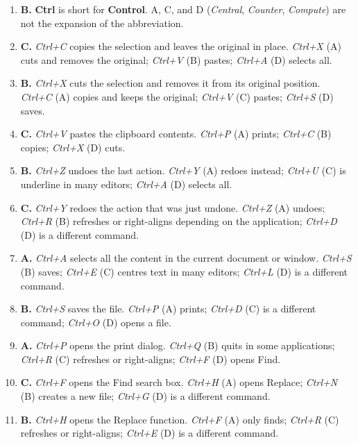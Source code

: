 \begin{enumerate}[label=\textbf{Q\arabic*.}, leftmargin=*]
\item \textbf{B.} \textbf{Ctrl} is short for \textbf{Control}. A, C, and D
  (\textit{Central}, \textit{Counter}, \textit{Compute}) are not the expansion
  of the abbreviation.
\item \textbf{C.} \textit{Ctrl+C} copies the selection and leaves the original
  in place. \textit{Ctrl+X} (A) cuts and removes the original; \textit{Ctrl+V}
  (B) pastes; \textit{Ctrl+A} (D) selects all.
\item \textbf{B.} \textit{Ctrl+X} cuts the selection and removes it from its
  original position. \textit{Ctrl+C} (A) copies and keeps the original;
  \textit{Ctrl+V} (C) pastes; \textit{Ctrl+S} (D) saves.
\item \textbf{C.} \textit{Ctrl+V} pastes the clipboard contents. \textit{Ctrl+P}
  (A) prints; \textit{Ctrl+C} (B) copies; \textit{Ctrl+X} (D) cuts.
\item \textbf{B.} \textit{Ctrl+Z} undoes the last action. \textit{Ctrl+Y} (A)
  redoes instead; \textit{Ctrl+U} (C) is underline in many editors; \textit{Ctrl+A}
  (D) selects all.
\item \textbf{C.} \textit{Ctrl+Y} redoes the action that was just undone.
  \textit{Ctrl+Z} (A) undoes; \textit{Ctrl+R} (B) refreshes or right-aligns
  depending on the application; \textit{Ctrl+D} (D) is a different command.
\item \textbf{A.} \textit{Ctrl+A} selects all the content in the current
  document or window. \textit{Ctrl+S} (B) saves; \textit{Ctrl+E} (C) centres
  text in many editors; \textit{Ctrl+L} (D) is a different command.
\item \textbf{B.} \textit{Ctrl+S} saves the file. \textit{Ctrl+P} (A) prints;
  \textit{Ctrl+D} (C) is a different command; \textit{Ctrl+O} (D) opens a file.
\item \textbf{A.} \textit{Ctrl+P} opens the print dialog. \textit{Ctrl+Q} (B)
  quits in some applications; \textit{Ctrl+R} (C) refreshes or right-aligns;
  \textit{Ctrl+F} (D) opens Find.
\item \textbf{C.} \textit{Ctrl+F} opens the Find search box. \textit{Ctrl+H} (A)
  opens Replace; \textit{Ctrl+N} (B) creates a new file; \textit{Ctrl+G} (D)
  is a different command.
\item \textbf{B.} \textit{Ctrl+H} opens the Replace function. \textit{Ctrl+F} (A)
  only finds; \textit{Ctrl+R} (C) refreshes or right-aligns; \textit{Ctrl+E} (D)
  is a different command.

\end{enumerate}
